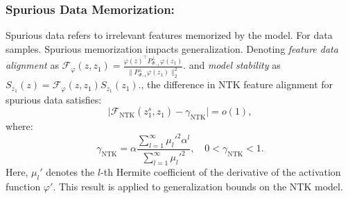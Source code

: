 \subsubsection{Spurious Data Memorization:}
Spurious data refers to irrelevant features memorized by the model. For data samples. Spurious memorization impacts generalization.
Denoting \textit{feature data alignment} as 
\(
\mathcal{F}_\varphi(z, z_1) = \frac{\varphi(z)^\top P_{\Phi_{-1}}^\perp \varphi(z_1)}{\big\| P_{\Phi_{-1}}^\perp \varphi(z_1) \big\|_2^2}.
\) and \textit{model stability} as
\(
S_{z_1}(z) = \mathcal{F}_\varphi(z, z_1) S_{z_1}(z_1).
\), the difference in NTK feature alignment for spurious 
data satisfies:~\cite{bombari2024how}
\[
\big| \mathcal{F}_{\text{NTK}}(z_1^s, z_1) - \gamma_{\text{NTK}} \big| = o(1),
\]
where:
\[
\gamma_{\text{NTK}} = \alpha \frac{\sum_{l=1}^\infty \mu_l'^2 \alpha^l}{\sum_{l=1}^\infty \mu_l'^2}, \quad 0 < \gamma_{\text{NTK}} < 1.
\]
Here, \( \mu_l' \) denotes the \(l\)-th Hermite coefficient of the derivative of the activation function \(\varphi'\). This result is applied to generalization bounds on the NTK model.
		
		
		
		
		
		
		